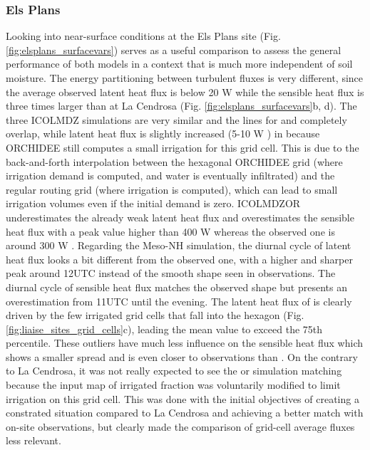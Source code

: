 \subsubsection*{Els Plans}
Looking into near-surface conditions at the Els Plans site (Fig. \ref{fig:elsplans_surfacevars}) serves as a useful comparison to assess the general performance of both models in a context that is much more independent of soil moisture.
The energy partitioning between turbulent fluxes is very different, since the average observed latent heat flux is below 20 W \persqm while the sensible heat flux is three times larger than at La Cendrosa (Fig. \ref{fig:elsplans_surfacevars}b, d). 
The three ICOLMDZ simulations are very similar and the lines for \noirr and \irr completely overlap, while latent heat flux is slightly increased (5-10 W \persqm) in \irrboost because ORCHIDEE still computes a small irrigation for this grid cell. This is due to the back-and-forth interpolation between the hexagonal ORCHIDEE grid (where irrigation demand is computed, and water is eventually infiltrated) and the regular routing grid (where irrigation is computed), which can lead to small irrigation volumes even if the initial demand is zero.
ICOLMDZOR underestimates the already weak latent heat flux and overestimates the sensible heat flux with a peak value higher than 400 W \persqm whereas the observed one is around 300 W \persqm. 
Regarding the Meso-NH simulation, the \mesoexact diurnal cycle of latent heat flux looks a bit different from the observed one, with a higher and sharper peak around 12UTC instead of the smooth shape seen in observations. The diurnal cycle of sensible heat flux matches the observed shape but presents an overestimation from 11UTC until the evening.
The latent heat flux of \mesomean is clearly driven by the few irrigated grid cells that fall into the hexagon (Fig. \ref{fig:liaise_sites_grid_cells}c), leading the mean value to exceed the 75th percentile. These outliers have much less influence on the sensible heat flux which shows a smaller spread and is even closer to observations than \mesoexact.
On the contrary to La Cendrosa, it was not really expected to see the \irr or \irrboost simulation matching \mesomean because the input map of irrigated fraction was voluntarily modified to limit irrigation on this grid cell. This was done with the initial objectives of creating a constrated situation compared to La Cendrosa and achieving a better match with on-site observations, but clearly made the comparison of grid-cell average fluxes less relevant.

